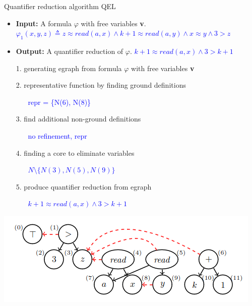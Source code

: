 \documentclass{beamer}
\begin{document}
\begin{frame}{Quantifier reduction algorithm QEL}

\begin{center}
\begin{itemize}
    \item \textbf{Input:} A formula $\varphi$ with free variables \textbf{v}. 
    \textcolor{blue}{$\varphi_1 (x,y,z) \triangleq z \approx read(a,x) \land k + 1 \approx read(a,y) \land x \approx y \land 3 > z$}
    \item \textbf{Output:} A quantifier reduction of $\varphi$.
    \textcolor{blue}{$k+1 \approx read(a,x) \land 3 > k+1$}
    \item[1.] generating egraph from formula $\varphi$ with free variables
    \textbf{v}
    \item[2.] representative function by finding ground definitions
    \begin{itemize}
        \item[] \textcolor{blue}{repr = \{N(6), N(8)\}}
    \end{itemize}
    \item[3.] find additional non-ground definitions
    \begin{itemize}
        \item[] \textcolor{blue}{no refinement, repr}
    \end{itemize}
    \item[4.] finding a core to eliminate variables
    \begin{itemize}
        \item[] \textcolor{blue}{$N \setminus \{N(3), N(5), N(9) \}$}
    \end{itemize}
    \item[5.] produce quantifier reduction from egraph
    \begin{itemize}
        \item[] \textcolor{blue}{$k+1 \approx read(a,x) \land 3 > k+1$}
    \end{itemize}
\end{itemize}
\end{center}
\begin{center}
\includegraphics[scale=0.4]{FMI1.png}
\end{center}

\end{frame}
\end{document}
